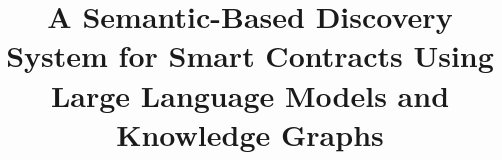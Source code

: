 \documentclass[conference,a4paper,english]{IEEEtran}
\begin{document}
\title{A Semantic-Based Discovery System for Smart Contracts Using Large Language Models and Knowledge Graphs}



\maketitle







% 

\printbibliography{}

\vspace{12pt}
\end{document}
